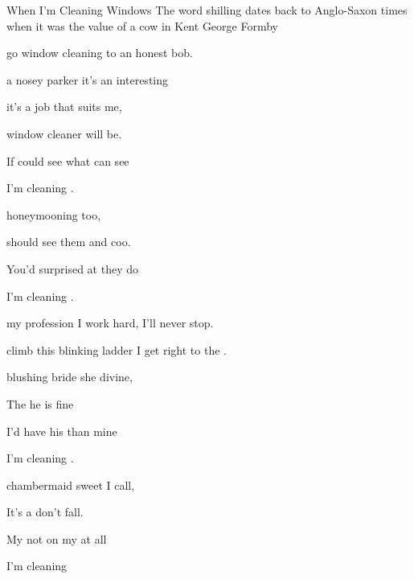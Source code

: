 \begin{SBSong}{When I'm Cleaning Windows}
  {The word shilling dates back to Anglo-Saxon times when it was the value of a cow in Kent}
  {George Formby}
  \begin{SBVerse*} 
     go window cleaning to  an honest bob. 
    
     a nosey parker it's an interesting   
  \end{SBVerse*}
  \begin{SBVerse} 
	 it's a job that  suits me, 
	
	 window cleaner  will be.
 
	If  could see what  can see 
	
	 I'm cleaning .
	
	 honeymooning  too, 
	
	 should see them  and coo.
	
	You'd  surprised at  they do 
	
	 I'm cleaning .
  \end{SBVerse}
  \begin{SBChorus}
	 my profession I work hard,  I'll never stop. 
	
	 climb this blinking ladder  I get right to the .
  \end{SBChorus}
  \begin{SBVerse}
	 blushing bride she  divine, 
	
	The  he is  fine 
	
	I'd  have his  than mine 
	
	 I'm cleaning .

	 chambermaid sweet  I call, 
	
	It's a   don't fall. 
	
	My  not on my  at all 
	
	 I'm cleaning 


\end{SBVerse}
\end{SBSong}
